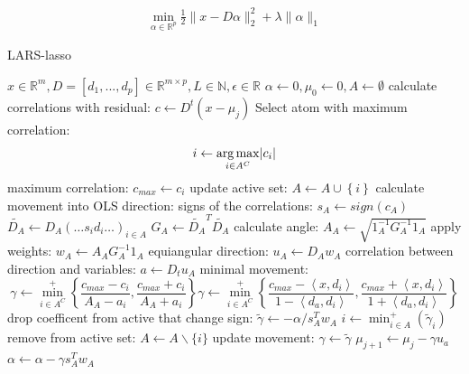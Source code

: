 \begin{align}
\min_{\alpha\in\mathbb{R}^{p}}  \frac{1}{2} \lVert x - D\alpha \rVert^{2}_{2} +
\lambda \lVert \alpha \rVert_{1}
\end{align}

\begin{algorithm}
\caption{LARS-lasso}
\label{alg:lars}
\begin{algorithmic}[1]
\REQUIRE $x \in \mathbb{R}^m, D =[d_1,...,d_p] \in \mathbb{R}^{m\times p}, L \in
\mathbb{N}, \epsilon \in \mathbb{R}$
\STATE $\alpha \gets 0, \mu_{0} \gets 0, A \gets \emptyset$
\STATE calculate correlations with residual: $c \gets D^t\left( x-\mu_j \right)
$
\STATE Select atom with maximum correlation: 
\begin{equation*}
i \gets \argmax_{i \in A^C} \lvert c_i  \rvert %
\end{equation*}
\STATE maximum correlation: $c_{max} \gets c_i $ %
\STATE update active set: $A \gets A \cup \left\{i\right\} $
\STATE calculate movement into OLS direction:
\STATE signs of the correlations: $s_A \gets  sign\left(c_A\right)$
\STATE $\tilde{D_A} \gets D_A\left(\ldots s_id_i \ldots\right)_{i\in A}$
\STATE $G_A \gets \tilde{D_A}^T\tilde{D_A}$
\STATE calculate angle: $A_A \gets \sqrt{ 1_A^{-1} G_A^{-1} 1_A
}$
\STATE apply weights: $w_A \gets A_AG_A^{-1}1_A$
\STATE equiangular direction: $u_A \gets D_Aw_A$
\STATE correlation between direction and variables: $a \gets D_tu_A$
\STATE minimal movement:
\begin{equation*}
\gamma \gets \min_{i\in A^C}^{+} \left\lbrace \frac{c_{max}-c_i }{A_A-a_i },
\frac{c_{max}+c_i }{A_A+a_i } \right\rbrace
\gamma \gets \min_{i\in A^C}^{+} \left\lbrace \frac{c_{max}-\left< x,d_i
\right> }{1-\left< d_a,d_i \right> }, \frac{c_{max}+\left< x,d_i \right>
}{1+\left< d_a,d_i \right> } \right\rbrace
\end{equation*}
\STATE drop coefficent from active that change sign: 
\STATE $ \tilde{\gamma} \gets -\alpha/s_A^Tw_A  $
\STATE $ i \gets \min_{i\in A}^{+} \left( \tilde{\gamma}_i \right) $
\STATE remove from active set: $ A \gets A \backslash \{i\} $
\STATE update movement: $ \gamma \gets \tilde{\gamma} $  
\ENDIF
\STATE $ \mu_{j+1} \gets \mu_{j} - \gamma u_a $
\STATE $ \alpha \gets \alpha - \gamma s_A^Tw_A $

\ENDFOR

\end{algorithmic}
\end{algorithm}

